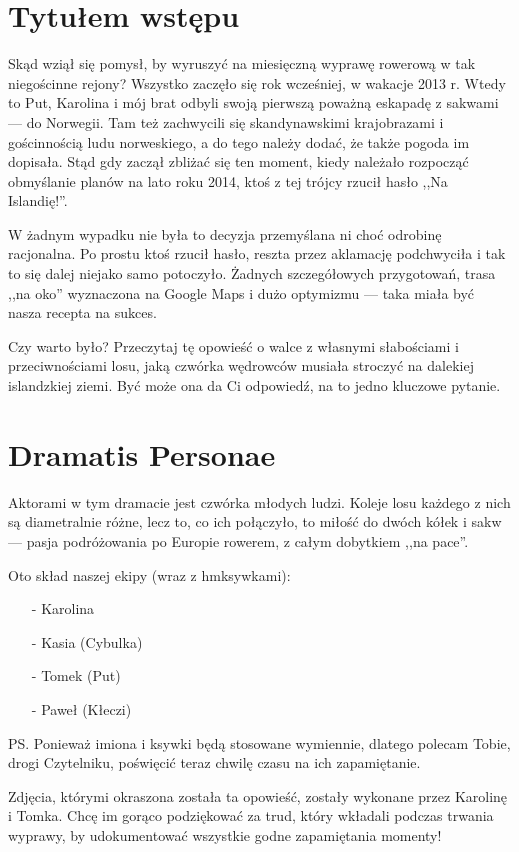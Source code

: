 \chapter*{Tytułem wstępu}

Skąd wziął się pomysł, by wyruszyć na miesięczną wyprawę rowerową w tak niegościnne rejony? Wszystko zaczęło się rok wcześniej, w wakacje 2013 r. Wtedy to Put, Karolina i mój brat odbyli swoją pierwszą poważną eskapadę z sakwami --- do Norwegii. Tam też zachwycili się skandynawskimi krajobrazami i gościnnością ludu norweskiego, a do tego należy dodać, że także pogoda im dopisała. Stąd gdy zaczął zbliżać się ten moment, kiedy należało rozpocząć obmyślanie planów na lato roku 2014, ktoś z tej trójcy rzucił hasło ,,Na Islandię!''.

W żadnym wypadku nie była to decyzja przemyślana ni choć odrobinę racjonalna. Po prostu ktoś rzucił hasło, reszta przez aklamację podchwyciła i tak to się dalej niejako samo potoczyło. Żadnych szczegółowych przygotowań, trasa ,,na oko'' wyznaczona na Google Maps i dużo optymizmu --- taka miała być nasza recepta na sukces.

Czy warto było? Przeczytaj tę opowieść o walce z własnymi słabościami i przeciwnościami losu, jaką czwórka wędrowców musiała stroczyć na dalekiej islandzkiej ziemi. Być może ona da Ci odpowiedź, na to jedno kluczowe pytanie.

\newpage

\chapter*{Dramatis Personae}

Aktorami w tym dramacie jest czwórka młodych ludzi. Koleje losu każdego z nich są diametralnie różne, lecz to, co ich połączyło, to miłość do dwóch kółek i sakw --- pasja podróżowania po Europie rowerem, z całym dobytkiem ,,na pace''.

Oto skład naszej ekipy (wraz z hm\textellipsis ksywkami):
\begin{itemize}
	\item[-] Karolina
	\item[-] Kasia (Cybulka)
	\item[-] Tomek (Put)
	\item[-] Paweł (Kłeczi)
\end{itemize}

{\small PS. Ponieważ imiona i ksywki będą stosowane wymiennie, dlatego polecam Tobie, drogi Czytelniku, poświęcić teraz chwilę czasu na ich zapamiętanie.}


\vspace{1cm}

Zdjęcia, którymi okraszona została ta opowieść, zostały wykonane przez Karolinę i Tomka. Chcę im gorąco podziękować za trud, który wkładali podczas trwania wyprawy, by udokumentować wszystkie godne zapamiętania momenty!


